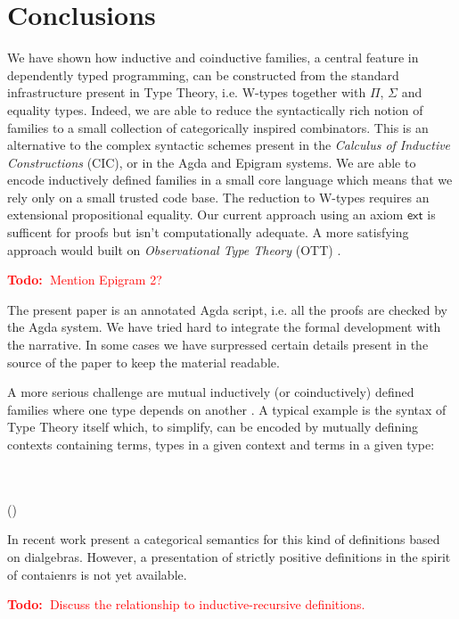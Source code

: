 \documentclass[a4paper]{article}
\newcommand{\todo}[1]{\textcolor{red}{\textbf{Todo:~}#1}}
\newcommand{\Conid}[1]{\mathit{#1}}
\newcommand{\Varid}[1]{\mathit{#1}}
\def\resethooks{%
  \global\let\SaveRestoreHook\empty
  \global\let\ColumnHook\empty}
\let\hspre\empty
\let\hspost\empty
\renewcommand\Varid[1]{\mathord{\textsf{#1}}}
\let\Conid\Varid
\begin{document}
\section{Conclusions}

We have shown how inductive and coinductive families, a central
feature in dependently typed programming, can be constructed from the
standard infrastructure present in Type Theory, i.e. W-types together
with $\Pi$, $\Sigma$ and equality types. Indeed, we are able to reduce
the syntactically rich notion of families to a small collection of
categorically inspired combinators. This is an alternative to the
complex syntactic schemes present in the \emph{Calculus of Inductive
  Constructions} (CIC), or in the Agda and Epigram systems. We are
able to encode inductively defined families in a small core language
which means that we rely only on a small trusted code base. The
reduction to W-types requires an extensional propositional
equality. Our current approach using an axiom \ensuremath{\Varid{ext}} is sufficent for
proofs but isn't computationally adequate. A more satisfying approach
would built on \emph{Observational Type Theory} (OTT)
\cite{alti:ott-conf}.

\todo{Mention Epigram 2?}

The present paper is an annotated Agda script, i.e. all the proofs are
checked by the Agda system. We have tried hard to integrate the formal
development with the narrative. In some cases we have surpressed
certain details present in the source of the paper to keep the
material readable.

A more serious challenge are mutual inductively (or coinductively)
defined families where one type depends on another
\cite{setzer-forsberg-indind}. A typical example is the syntax of Type
Theory itself which, to simplify, can be encoded by mutually defining
contexts containing terms, types in a given context and terms in a
given type:
\begin{hscode}\SaveRestoreHook
\column{B}{@{}>{\hspre}l<{\hspost}@{}}%
\column{E}{@{}>{\hspre}l<{\hspost}@{}}%
\>[B]{}\Conid{Con}\;\in\;\Conid{Set}{}\<[E]%
\\
\>[B]{}\Conid{Ty}\;\in\;\Conid{Con}\;\rightarrow\;\Conid{Set}{}\<[E]%
\\
\>[B]{}\Conid{Tm}\;\in\;(\Gamma\;\in\;\Conid{Con})\;\rightarrow\;\Conid{Ty}\;\Gamma\;\rightarrow\;\Conid{Set}{}\<[E]%
\ColumnHook
\end{hscode}\resethooks
In recent work \cite{calco-indind} present a categorical semantics for
this kind of definitions based on dialgebras. However, a presentation
of strictly positive definitions in the spirit of contaienrs is not
yet available.

\todo{Discuss the relationship to inductive-recursive definitions.}



\end{document}
